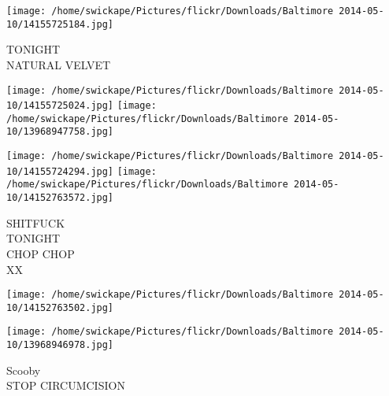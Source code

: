 \documentclass[10pt,letterpaper]{article}
\begin{document}
\vspace{0.25in}
\texttt{[image: /home/swickape/Pictures/flickr/Downloads/Baltimore 2014-05-10/14155725184.jpg]}

TONIGHT\\
NATURAL VELVET
\pagebreak

\texttt{[image: /home/swickape/Pictures/flickr/Downloads/Baltimore 2014-05-10/14155725024.jpg]}
\texttt{[image: /home/swickape/Pictures/flickr/Downloads/Baltimore 2014-05-10/13968947758.jpg]}

\texttt{[image: /home/swickape/Pictures/flickr/Downloads/Baltimore 2014-05-10/14155724294.jpg]}
\texttt{[image: /home/swickape/Pictures/flickr/Downloads/Baltimore 2014-05-10/14152763572.jpg]}

SHITFUCK\\
TONIGHT\\
CHOP CHOP\\
XX
\pagebreak

\texttt{[image: /home/swickape/Pictures/flickr/Downloads/Baltimore 2014-05-10/14152763502.jpg]}

\vspace{0.25in}
\texttt{[image: /home/swickape/Pictures/flickr/Downloads/Baltimore 2014-05-10/13968946978.jpg]}

Scooby\\
STOP CIRCUMCISION
\pagebreak
\end{document}
